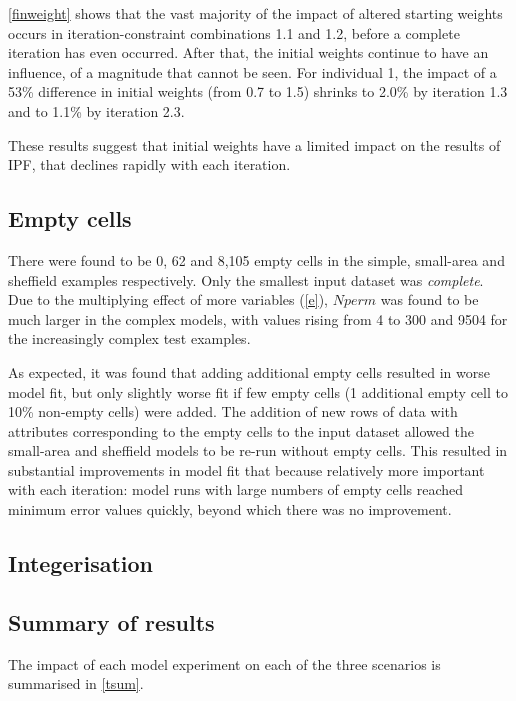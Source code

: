 \documentclass[a4paper,10pt]{article}
\begin{document}
\cref{finweight} shows that the vast majority of the impact of altered starting weights occurs in iteration-constraint
combinations 1.1 and 1.2, before a complete iteration has even occurred. 
After that, the initial weights continue to have an influence, of a magnitude that cannot be 
seen. For individual 1, the impact of a 53\% difference in initial weights (from 0.7 to 1.5) shrinks to 
2.0\% by iteration 1.3 and to 1.1\% by iteration 2.3. 

These results suggest that initial weights have a limited impact on the results of IPF, that declines rapidly with each iteration. 

\subsection{Empty cells}

There were found to be 0, 62 and 8,105 empty cells in the simple, small-area and sheffield
examples respectively. Only the smallest input dataset was
\emph{complete}. Due to the multiplying effect of more variables (\cref{e}),
$Nperm$ was found to be much larger in the complex models, with values rising from
4 to 300 and 9504 for the increasingly complex test examples. 

As expected, it was found that adding additional empty cells
resulted in worse model fit, but only slightly worse fit if few empty
cells (1 additional empty cell to 10\% non-empty cells) were added.
The addition of new rows of data with attributes corresponding
to the empty cells to the input dataset allowed the small-area and sheffield
models to be re-run without empty cells. This resulted in substantial improvements in
model fit that because relatively more important with each iteration: model
runs with large numbers of empty cells reached minimum error values quickly, beyond
which there was no improvement.

\subsection{Integerisation}

\subsection{Summary of results}

The impact of each model experiment on each of the three scenarios
is summarised in \cref{tsum}.
\end{document}
